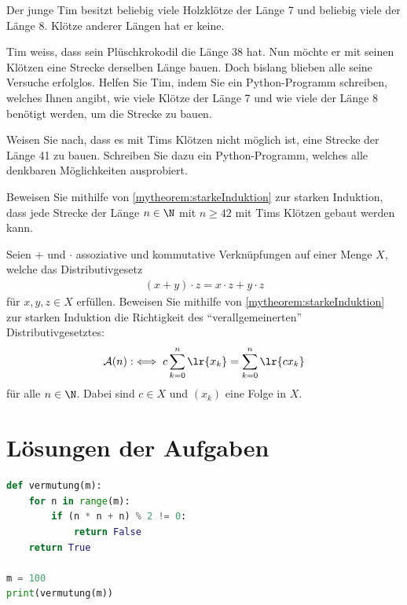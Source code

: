 \begin{myexercise}\label{myexercise:0210}
	Der junge Tim besitzt beliebig viele Holzklötze der Länge 7 und beliebig viele der Länge 8. Klötze anderer Längen hat er keine.
	\begin{aenum}
		\item Tim weiss, dass sein Plüschkrokodil die Länge 38 hat. Nun möchte er mit seinen Klötzen eine Strecke derselben Länge bauen. Doch bislang blieben alle seine Versuche erfolglos. Helfen Sie Tim, indem Sie ein Python-Programm schreiben, welches Ihnen angibt, wie viele Klötze der Länge 7 und wie viele der Länge 8 benötigt werden, um die Strecke zu bauen.
		\item Weisen Sie nach, dass es mit Tims Klötzen nicht möglich ist, eine Strecke der Länge 41 zu bauen. Schreiben Sie dazu ein Python-Programm, welches alle denkbaren Möglichkeiten ausprobiert.
		\item Beweisen Sie mithilfe von \cref{mytheorem:starkeInduktion} zur starken Induktion, dass jede Strecke der Länge $n\in\N$ mit $n\geq 42$ mit Tims Klötzen gebaut werden kann.
	\end{aenum}
\end{myexercise}


\begin{myexercise}\label{myexercise:0295}
	Seien $+$ und $\cdot$ assoziative und kommutative Verknüpfungen auf einer Menge $X$, welche das Distributivgesetz
	\begin{align*}
		(x+y)\cdot z = x\cdot z + y\cdot z
	\end{align*}
	für $x,y,z\in X$ erfüllen. Beweisen Sie mithilfe von \cref{mytheorem:starkeInduktion} zur starken Induktion die Richtigkeit des \enquote{verallgemeinerten} Distributivgesetztes:
	\begin{align*}
		\mathcal{A}(n) :\iff c\sum_{k=0}^n\lr{x_k} = \sum_{k=0}^n\lr{cx_k}
	\end{align*}
	für alle $n\in\N$. Dabei sind $c\in X$ und $(x_k)$ eine Folge in $X$.
\end{myexercise}

\clearpage
\section{Lösungen der Aufgaben}

\begin{myanswer}[myexercise:0200]
	\begin{lstlisting}[language=Python,caption=Vermutung überprüfen]
def vermutung(m):
    for n in range(m):
        if (n * n + n) % 2 != 0:
            return False
    return True

m = 100
print(vermutung(m))
\end{lstlisting}
\end{myanswer}

